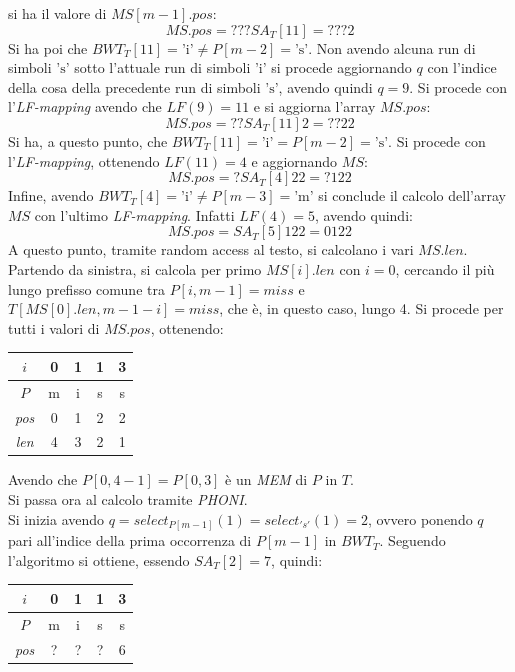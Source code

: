 \begin{esempio}
  si ha il valore di $MS[m-1].pos$:
  \[MS.pos = ???SA_T[11]=???2\]
  Si ha poi che $BWT_T[11]=\mbox{'i'}\neq P[m-2]=\mbox{'s'}$. Non avendo alcuna
  run di simboli $\mbox{'s'}$ sotto l'attuale run di simboli $\mbox{'i'}$ si
  procede aggiornando $q$ con l'indice della cosa della precedente run di
  simboli $\mbox{'s'}$, avendo quindi $q=9$. Si procede con
  l'\textit{LF-mapping} avendo che $LF(9)=11$ e si aggiorna l'array $MS.pos$:
  \[MS.pos = ??SA_T[11]2=??22\]
  Si ha, a questo punto, che $BWT_T[11]=\mbox{'i'}= P[m-2]=\mbox{'s'}$. Si
  procede con l'\textit{LF-mapping}, ottenendo $LF(11)=4$ e aggiornando $MS$:
  \[MS.pos = ?SA_T[4]22=?122\]
  Infine, avendo $BWT_T[4]=\mbox{'i'}\neq P[m-3]=\mbox{'m'}$ si conclude il
  calcolo dell'array $MS$ con l'ultimo \textit{LF-mapping}. Infatti $LF(4)=5$,
  avendo quindi:
  \[MS.pos = SA_T[5]122=0122\]
  A questo punto, tramite random access al testo, si calcolano i vari
  $MS.len$. Partendo da sinistra, si calcola per primo $MS[i].len$ con $i=0$,
  cercando il più lungo prefisso comune tra $P[i,m-1]=miss$ e $T[MS[0].len,
  m-1-i]=miss$, che è, in questo caso, lungo 4. Si procede per tutti i valori di
  $MS.pos$, ottenendo:
  \begin{table}[H]
    \centering
    \begin{tabular}{c||c|c|c|c}
      $i$ & 0 & 1 & 1 & 3 \\
      \hline
      $P$ & m & i & s & s \\
      \hline
      \hline
      \textit{pos} & 0 & 1 & 2 & 2\\
      \hline
      \textit{len} & 4 & 3 & 2 & 1\\
    \end{tabular}
  \end{table}
  Avendo che $P[0,4-1]=P[0,3]$ è un \textit{MEM} di $P$ in $T$.\\
  Si passa ora al calcolo tramite \textit{PHONI}.\\
  Si inizia avendo $q=select_{P[m-1]}(1)=select_{'s'}(1)=2$, ovvero ponendo $q$
  pari all'indice della prima occorrenza di $P[m-1]$ in $BWT_T$. Seguendo
  l'algoritmo si ottiene, essendo $SA_T[2]=7$, quindi:
  \begin{table}[H]
    \centering
    \begin{tabular}{c||c|c|c|c}
      $i$ & 0 & 1 & 1 & 3 \\
      \hline
      $P$ & m & i & s & s \\
      \hline
      \hline
      \textit{pos} & ? & ? & ? & 6\\
      \hline

\end{tabular}
\end{table}
\end{esempio}

